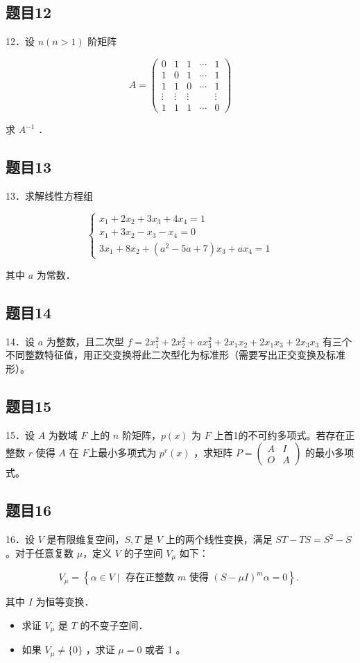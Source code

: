 \documentclass{article}
\begin{document}
\subsection{题目12}
12．设 \(n(n>1)\) 阶矩阵

\[
A=\left(\begin{array}{ccccc}
0 & 1 & 1 & \cdots & 1 \\
1 & 0 & 1 & \cdots & 1 \\
1 & 1 & 0 & \cdots & 1 \\
\vdots & \vdots & \vdots & & \vdots \\
1 & 1 & 1 & \cdots & 0
\end{array}\right)
\]

求 \(A^{-1}\) ．

\subsection{题目13}
13．求解线性方程组

\[
\left\{\begin{array}{l}
x_{1}+2 x_{2}+3 x_{3}+4 x_{4}=1 \\
x_{1}+3 x_{2}-x_{3}-x_{4}=0 \\
3 x_{1}+8 x_{2}+\left(a^{2}-5 a+7\right) x_{3}+a x_{4}=1
\end{array}\right.
\]

其中 \(a\) 为常数．

\subsection{题目14}
14．设 \(a\) 为整数，且二次型 \(f=2 x_{1}^{2}+2 x_{2}^{2}+a x_{3}^{2}+2 x_{1} x_{2}+2 x_{1} x_{3}+2 x_{3} x_{3}\) 有三个不同整数特征值，用正交变换将此二次型化为标准形（需要写出正交变换及标准形）。

\subsection{题目15}
15．设 \(A\) 为数域 \(F\) 上的 \(n\) 阶矩阵，\(p(x)\) 为 \(F\) 上首1的不可约多项式。若存在正整数 \(r\) 使得 \(A\) 在 \(F\)上最小多项式为 \(p^{r}(x)\) ，求矩阵 \(P=\left(\begin{array}{cc}A & I \\ O & A\end{array}\right)\) 的最小多项式。

\subsection{题目16}
16．设 \(V\) 是有限维复空间，\(S, T\) 是 \(V\) 上的两个线性变换，满足 \(S T-T S=S^{2}-S\) 。对于任意复数 \(\mu\)，定义 \(V\) 的子空间 \(V_{\mu}\) 如下：

\[
V_{\mu}=\left\{\alpha \in V \mid \text { 存在正整数 } m \text { 使得 }(S-\mu I)^{m} \alpha=0\right\} \text {. }
\]

其中 \(I\) 为恒等变换．

\begin{itemize}
  \item[（1）] 求证 \(V_{\mu}\) 是 \(T\) 的不变子空间．
  \item[（2）] 如果 \(V_{\mu} \neq\{0\}\) ，求证 \(\mu=0\) 或者 1 。
\end{itemize}
\end{document}
